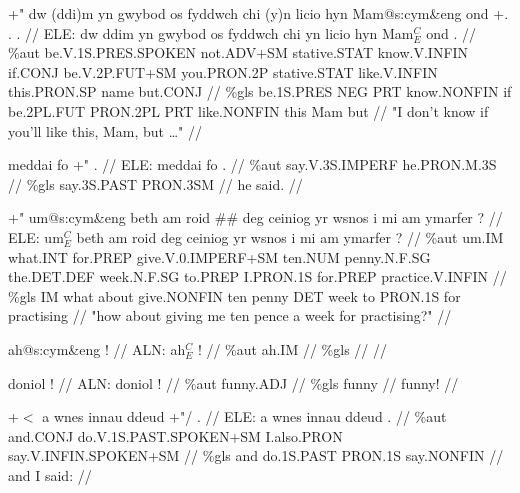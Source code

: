 \documentclass[a4paper,10pt]{article}
\begin{document}
\ex
\begingl[lingstyle=gergl]
\glchat +" dw (ddi)m yn gwybod os fyddwch chi (y)n licio hyn Mam@s:cym\&eng ond +. . . //
\glsurface ELE:  dw ddim yn gwybod os fyddwch chi yn licio hyn Mam$^{C}_{E}$ ond .  //
\glauto \%aut  be{\scriptsize .V.1S.PRES.SPOKEN} not{\scriptsize .ADV+SM} stative{\scriptsize .STAT} know{\scriptsize .V.INFIN} if{\scriptsize .CONJ} be{\scriptsize .V.2P.FUT+SM} you{\scriptsize .PRON.2P} stative{\scriptsize .STAT} like{\scriptsize .V.INFIN} this{\scriptsize .PRON.SP} name but{\scriptsize .CONJ}   //
\glmanual \%gls  be{\scriptsize .1S.PRES} NEG PRT know{\scriptsize .NONFIN} if be{\scriptsize .2PL.FUT} PRON{\scriptsize .2PL} PRT like{\scriptsize .NONFIN} this Mam but   //
\gleng "I don't know if you'll like this, Mam, but \dots " //
\endgl
\xe

\ex
\begingl[lingstyle=gergl]
\glchat meddai fo +" . //
\glsurface ELE:  meddai fo .  //
\glauto \%aut  say{\scriptsize .V.3S.IMPERF} he{\scriptsize .PRON.M.3S}   //
\glmanual \%gls  say{\scriptsize .3S.PAST} PRON{\scriptsize .3SM}   //
\gleng he said. //
\endgl
\xe

\ex
\begingl[lingstyle=gergl]
\glchat +" um@s:cym\&eng beth am roid \#\# deg ceiniog yr wsnos i mi am ymarfer ? //
\glsurface ELE:  um$^{C}_{E}$ beth am roid deg ceiniog yr wsnos i mi am ymarfer ?  //
\glauto \%aut  um{\scriptsize .IM} what{\scriptsize .INT} for{\scriptsize .PREP} give{\scriptsize .V.0.IMPERF+SM} ten{\scriptsize .NUM} penny{\scriptsize .N.F.SG} the{\scriptsize .DET.DEF} week{\scriptsize .N.F.SG} to{\scriptsize .PREP} I{\scriptsize .PRON.1S} for{\scriptsize .PREP} practice{\scriptsize .V.INFIN}   //
\glmanual \%gls  IM what about give{\scriptsize .NONFIN} ten penny DET week to PRON{\scriptsize .1S} for practising   //
\gleng "how about giving me ten pence a week for practising?" //
\endgl
\xe

\ex
\begingl[lingstyle=gergl]
\glchat ah@s:cym\&eng ! //
\glsurface ALN:  ah$^{C}_{E}$ !  //
\glauto \%aut  ah{\scriptsize .IM}   //
\glmanual \%gls     //
\gleng  //
\endgl
\xe

\ex
\begingl[lingstyle=gergl]
\glchat doniol ! //
\glsurface ALN:  doniol !  //
\glauto \%aut  funny{\scriptsize .ADJ}   //
\glmanual \%gls  funny   //
\gleng funny! //
\endgl
\xe

\ex
\begingl[lingstyle=gergl]
\glchat +$<$ a wnes innau ddeud +"/ . //
\glsurface ELE:  a wnes innau ddeud .  //
\glauto \%aut  and{\scriptsize .CONJ} do{\scriptsize .V.1S.PAST.SPOKEN+SM} I{\scriptsize .also.PRON} say{\scriptsize .V.INFIN.SPOKEN+SM}   //
\glmanual \%gls  and do{\scriptsize .1S.PAST} PRON{\scriptsize .1S} say{\scriptsize .NONFIN}   //
\gleng and I said: //
\endgl
\xe
\end{document}
